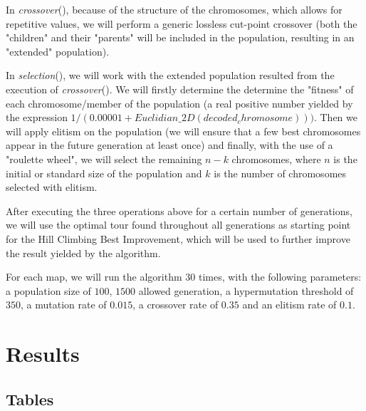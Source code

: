 \documentclass[a4paper]{article}
\begin{document}
In {\itshape crossover}(), because of the structure of the chromosomes, which allows for repetitive values, we will perform a generic lossless cut-point crossover (both the "children" and their "parents" will be included in the population, resulting in an "extended" population).

In {\itshape selection}(), we will work with the extended population resulted from the execution of {\itshape crossover}(). We will firstly determine the determine the "fitness" of each chromosome/member of the population (a real positive number yielded by the expression $1/(0.00001 + Euclidian\_2D(decoded_chromosome)))$. Then we will apply elitism on the population (we will ensure that a few best chromosomes appear in the future generation at least once) and finally, with the use of a "roulette wheel", we will select the remaining $n-k$ chromosomes, where $n$ is the initial or standard size of the population and $k$ is the number of chromosomes selected with elitism.

After executing the three operations above for a certain number of generations, we will use the optimal tour found throughout all generations as starting point for the Hill Climbing Best Improvement, which will be used to further improve the result yielded by the algorithm.

For each map, we will run the algorithm $30$ times, with the following parameters: a population size of $100$, $1500$ allowed generation, a hypermutation threshold of $350$, a mutation rate of $0.015$, a crossover rate of $0.35$ and an elitism rate of $0.1$.

\section{Results}

\subsection{Tables}
\end{document}

